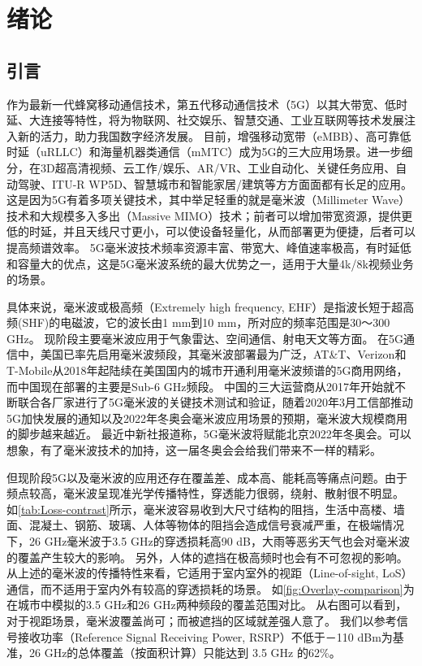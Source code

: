 \documentclass[supercite]{HustGraduPaper}
\begin{document}
\clearpage%

\section{绪论}

\subsection{引言}

作为最新一代蜂窝移动通信技术，第五代移动通信技术（5G）以其大带宽、低时延、大连接等特性，将为物联网、社交娱乐、智慧交通、工业互联网等技术发展注入新的活力，助力我国数字经济发展。
目前，增强移动宽带（eMBB）、高可靠低时延（uRLLC）和海量机器类通信（mMTC）成为5G的三大应用场景。进一步细分，在3D超高清视频、云工作/娱乐、AR/VR、工业自动化、关键任务应用、自动驾驶、ITU-R WP5D、智慧城市和智能家居/建筑等方方面面都有长足的应用。
这是因为5G有着多项关键技术，其中举足轻重的就是毫米波（Millimeter Wave）技术和大规模多入多出（Massive MIMO）技术；前者可以增加带宽资源，提供更低的时延，并且天线尺寸更小，可以使设备轻量化，从而部署更为便捷，后者可以提高频谱效率。
5G毫米波技术频率资源丰富、带宽大、峰值速率极高，有时延低和容量大的优点，这是5G毫米波系统的最大优势之一，适用于大量4k/8k视频业务的场景\cite{8732419}。

具体来说，毫米波或极高频（Extremely high frequency, EHF）是指波长短于超高频(SHF)的电磁波，它的波长由1 mm到10 mm，所对应的频率范围是30～300 GHz\cite{enwiki:1021979549}。
现阶段主要毫米波应用于气象雷达、空间通信、射电天文等方面。
在5G通信中，美国已率先启用毫米波频段，其毫米波部署最为广泛，AT\&T、Verizon和T-Mobile从2018年起陆续在美国国内的城市开通利用毫米波频谱的5G商用网络，而中国现在部署的主要是Sub-6 GHz频段\cite{ZTE2020}。
中国的三大运营商从2017年开始就不断联合各厂家进行了5G毫米波的关键技术测试和验证，随着2020年3月工信部推动5G加快发展的通知以及2022年冬奥会毫米波应用场景的预期，毫米波大规模商用的脚步越来越近\cite{ZTE2020}。
最近中新社报道称，5G毫米波将赋能北京2022年冬奥会。可以想象，有了毫米波技术的加持，这一届冬奥会会给我们带来不一样的精彩。

但现阶段5G以及毫米波的应用还存在覆盖差、成本高、能耗高等痛点问题。由于频点较高，毫米波呈现准光学传播特性，穿透能力很弱，绕射、散射很不明显。
如\autoref{tab:Loss-contrast}所示，毫米波容易收到大尺寸结构的阻挡，生活中高楼、墙面、混凝土、钢筋、玻璃、人体等物体的阻挡会造成信号衰减严重，在极端情况下，26 GHz毫米波于3.5 GHz的穿透损耗高90 dB，大雨等恶劣天气也会对毫米波的覆盖产生较大的影响\cite{8732419}。
另外，人体的遮挡在极高频时也会有不可忽视的影响。
从上述的毫米波的传播特性来看，它适用于室内室外的视距（Line-of-sight, LoS）通信，而不适用于室内外有较高的穿透损耗的场景。
如\autoref{fig:Overlay-comparison}为在城市中模拟的3.5 GHz和26 GHz两种频段的覆盖范围对比。
从右图可以看到，对于视距场景，毫米波覆盖尚可；而被遮挡的区域就差强人意了。
我们以参考信号接收功率（Reference Signal Receiving Power, RSRP）不低于－110 dBm为基准，26 GHz的总体覆盖（按面积计算）只能达到 3.5 GHz 的62\%\cite{ZTE2020}。
\end{document}

